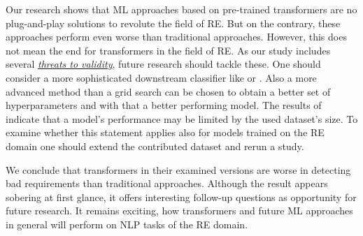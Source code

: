 Our research shows that \ac{ML} approaches based on pre-trained transformers are no plug-and-play solutions to revolute the field of \ac{RE}.
But on the contrary, these approaches perform even worse than traditional approaches.
However, this does not mean the end for transformers in the field of \ac{RE}.
As our study includes several \hyperref[chp:threats_to_validity]{\textit{threats to validity}}, future research should tackle these.
One should consider a more sophisticated downstream classifier like \textcite{Martino:2019} or \textcite{Gao:2019}.
Also a more advanced method than a grid search can be chosen to obtain a better set of hyperparameters and with that a better performing model.
The results of \textcite{Xu:2019} indicate that a model's performance may be limited by the used dataset's size.
To examine whether this statement applies also for models trained on the \ac{RE} domain one should extend the contributed dataset and rerun a study.

We conclude that transformers in their examined versions are worse in detecting bad requirements than traditional approaches.
Although the result appears sobering at first glance, it offers interesting follow-up questions as opportunity for future research.
It remains exciting, how transformers and future \ac{ML} approaches in general will perform on \ac{NLP} tasks of the \ac{RE} domain.
